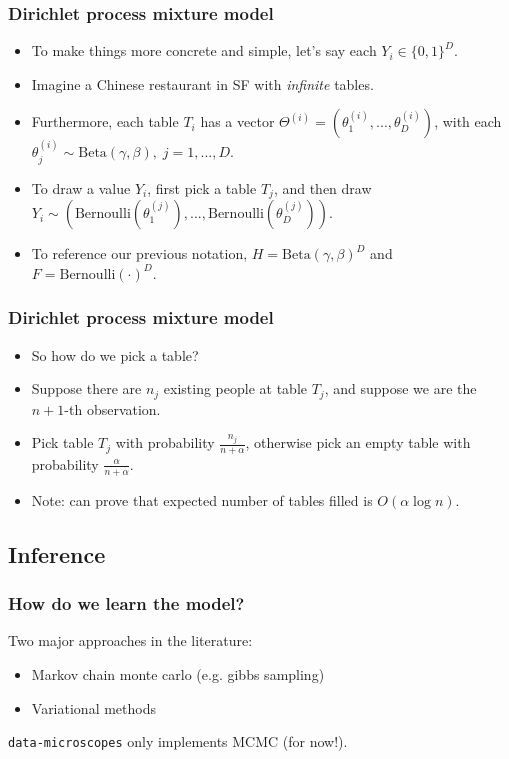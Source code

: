 \documentclass{beamer}
\begin{document}
\begin{frame}
\frametitle{Dirichlet process mixture model}
\begin{itemize}[<+->]
  \item To make things more concrete and simple, let's say each $Y_i \in \{0,1\}^{D}$.
  \item Imagine a Chinese restaurant in SF with \emph{infinite} tables.
  \item Furthermore, each table $T_i$ has a vector $\Theta^{(i)} = (\theta^{(i)}_1, ..., \theta^{(i)}_D)$, with
    each $\theta^{(i)}_j \sim \text{Beta}(\gamma, \beta),\; j{=}1,...,D$.
  \item To draw a value $Y_i$, first pick a table $T_j$, and then draw $Y_i \sim (\text{Bernoulli}(\theta^{(j)}_1), ..., \text{Bernoulli}(\theta^{(j)}_D))$.
  \item To reference our previous notation, $H=\text{Beta}(\gamma,\beta)^{D}$ and $F=\text{Bernoulli}(\cdot)^{D}$.
\end{itemize}
\end{frame}

\begin{frame}
\frametitle{Dirichlet process mixture model}
\begin{itemize}[<+->]
  \item So how do we pick a table?
  \item Suppose there are $n_j$ existing people at table $T_j$, and suppose we are the $n+1$-th observation.
  \item Pick table $T_j$ with probability $\frac{n_j}{n + \alpha}$, otherwise pick an empty table
    with probability $\frac{\alpha}{n + \alpha}$.
  \item Note: can prove that expected number of tables filled is $O(\alpha \log{n})$.
\end{itemize}
\end{frame}

\subsection{Inference}

\begin{frame}
\frametitle{How do we learn the model?}
Two major approaches in the literature:
\begin{itemize}[<+->]
  \item Markov chain monte carlo (e.g. gibbs sampling)
  \item Variational methods 
\end{itemize}
\pause
\texttt{data-microscopes} only implements MCMC (for now!). 
\end{frame}
\end{document}
